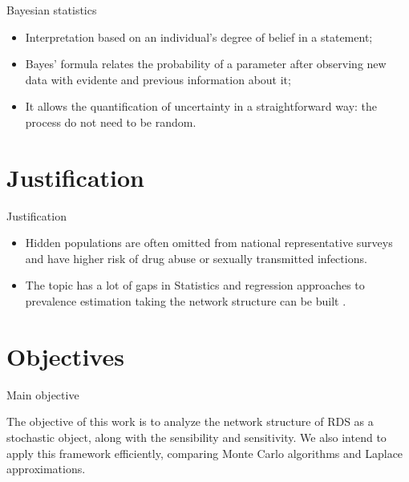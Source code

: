 \documentclass{beamer}
\newcommand{\Space}{\vspace{3ex}}
\begin{document}
\begin{frame}{Bayesian statistics}

  \begin{itemize}
    \item Interpretation based on an individual's degree of belief in a statement;

    \Space

    \item Bayes' formula relates the probability of a parameter after
    observing new data with evidente and previous information about it;

    \Space

    \item It allows the quantification of uncertainty in a straightforward
    way: the process do not need to be random.
  \end{itemize}

\end{frame}


\section{Justification}

\begin{frame}{Justification}

  \begin{itemize}
    \item Hidden populations are often omitted from national representative
    surveys and have higher risk of drug abuse or sexually transmitted
    infections. 

    \Space
    
    \item The topic has a lot of gaps in Statistics and regression approaches
    to prevalence estimation taking the network structure can be built \cite{bastos2012binary}.
  \end{itemize}
\end{frame}



\section{Objectives}

\begin{frame}{Main objective}

  The objective of this work is to analyze the network structure of RDS as a
stochastic object, along with the sensibility and sensitivity. We also intend
to apply this framework efficiently, comparing Monte Carlo algorithms and
Laplace approximations.
  
\end{frame}
\end{document}
